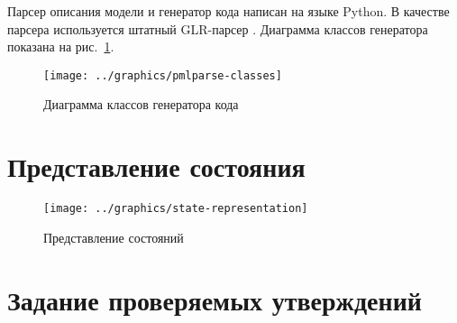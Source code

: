 Парсер описания модели и генератор кода написан на языке Python. В качестве парсера
используется штатный GLR-парсер . Диаграмма классов генератора показана на
рис.~\ref{fig:pmlparse-classes}.

\begin{figure}[ht]
  \centering
  \texttt{[image: ../graphics/pmlparse-classes]}
  \caption{Диаграмма классов генератора кода}
  \label{fig:pmlparse-classes}
\end{figure}

\section{Представление состояния}
\label{sec:state-represent}

\begin{figure}[ht]
  \centering
  \texttt{[image: ../graphics/state-representation]}  
  \caption{Представление состояний}
  \label{fig:state-repr}
\end{figure}

\section{Задание проверяемых утверждений}
\label{sec:assertions}


